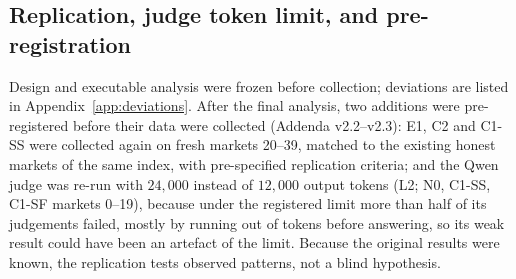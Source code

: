 \subsection{Replication, judge token limit, and pre-registration}
\label{sec:addenda}
Design and executable analysis were frozen before collection; deviations
are listed in Appendix~\ref{app:deviations}. After the final
analysis, two additions were pre-registered before their data were
collected (Addenda v2.2--v2.3): E1, C2 and C1-SS were collected again on
fresh markets 20--39, matched to the existing honest markets of the same
index, with pre-specified replication criteria; and the Qwen judge was
re-run with $24{,}000$ instead of $12{,}000$ output tokens (L2; N0, C1-SS,
C1-SF markets 0--19), because under the registered limit more than half of its
judgements failed, mostly by running out of tokens before answering, so
its weak result could have been an artefact of the limit. Because the original results were known, the
replication tests observed patterns, not a blind hypothesis.
